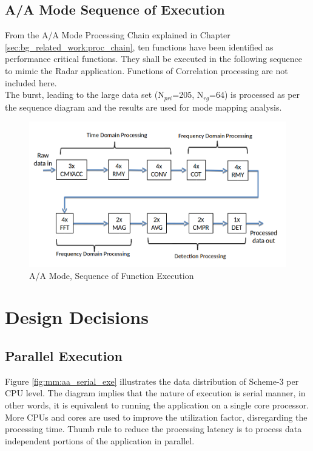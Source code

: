\subsection{A/A Mode Sequence of Execution}
From the A/A Mode Processing Chain explained in Chapter \ref{sec:bg_related_work:proc_chain}, ten functions have been identified as performance critical functions. They shall be executed in the following sequence to mimic the Radar application. Functions of Correlation processing are not included here.\\
The burst, leading to the large data set (N$_{pri}$=205, N$_{rg}$=64) is processed as per the sequence diagram and the results are used for mode mapping analysis.

\begin{figure}[h!]
	\centering
	\includegraphics[width=160mm]{figures/aa_seq}
	\caption{A/A Mode, Sequence of Function Execution}
	\label{fig:bg_related_work:aa_seq}
\end{figure}
\FloatBarrier

\section{Design Decisions}
\label{mm:design_decisions}

\subsection{Parallel Execution}
Figure \ref{fig:mm:aa_serial_exe} illustrates the data distribution of Scheme-3 per CPU level. The diagram implies that the nature of execution is serial manner, in other words, it is equivalent to running the application on a single core processor. More CPUs and cores are used to improve the utilization factor, disregarding the processing time. Thumb rule to reduce the processing latency is to process data independent portions of the application in parallel. 

